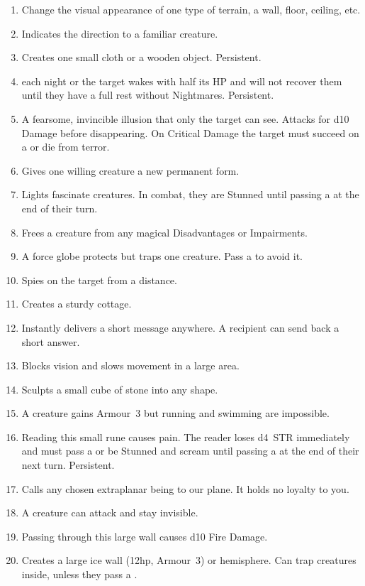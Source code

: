 \documentclass[itdr]{subfiles}
\begin{document}
\begin{enumerate}
	\item {} Change the visual appearance of one type of terrain, a wall, floor, ceiling, etc.
	\item {} Indicates the direction to a familiar creature.
	\item {} Creates one small cloth or a wooden object. Persistent.
	\item {}  each night or the target wakes with half its HP and will not recover them until they have a full rest without Nightmares. Persistent.
	\item {} A fearsome, invincible illusion that only the target can see. Attacks for d10 Damage before disappearing. On Critical Damage the target must succeed on a  or die from terror.
	\item {} Gives one willing creature a new permanent form.
	\item {} Lights fascinate creatures. In combat, they are Stunned until passing a  at the end of their turn.
	\item {} Frees a creature from any magical Disadvantages or Impairments.
	\item {} A force globe protects but traps one creature. Pass a  to avoid it.
	\item {} Spies on the target from a distance.
	\item {} Creates a sturdy cottage.
	\item {} Instantly delivers a short message anywhere. A recipient can send back a short \mbox{answer}.
	\item {} Blocks vision and slows movement in a large area.
	\item {} Sculpts a small cube of stone into any shape.
	\item {} A creature gains Armour~3 but running and swimming are impossible.
	\item {} Reading this small rune causes pain. The reader loses d4~STR immediately and must pass a  or be Stunned and scream until passing a  at the end of their next turn. Persistent.
	\item {} Calls any chosen extraplanar being to our plane. It holds no loyalty to you.
	\item {} A creature can attack and stay invisible.
	\item {} Passing through this large wall causes d10 Fire Damage.
	\item {} Creates a large ice wall (12hp, Armour~3) or hemisphere. Can trap creatures inside, unless they pass a .
\end{enumerate}
\end{document}
